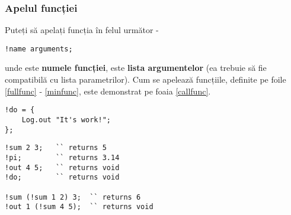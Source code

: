 \subsubsection{Apelul funcției}

Puteți să apelați funcția în felul următor -
\begin{lstlisting}[numbers=none]
!name arguments;
\end{lstlisting}
unde  este {\bf numele funcției},  este {\bf lista argumentelor} (ea trebuie să fie compatibilă cu lista parametrilor). Cum se apelează funcțiile, definite pe foile \ref{fullfunc} - \ref{minfunc}, este demonstrat pe foaia \ref{callfunc}.

\begin{lstlisting}[caption=Funcție fără argumente și tip de date, label=minfunc]
!do = {
	Log.out "It's work!";
};
\end{lstlisting}

\begin{lstlisting}[caption=Apeluri de funcții, label=callfunc]
!sum 2 3; 	`` returns 5
!pi; 		`` returns 3.14
!out 4 5; 	`` returns void
!do; 		`` returns void

!sum (!sum 1 2) 3;	`` returns 6
!out 1 (!sum 4 5);	`` returns void
\end{lstlisting}

